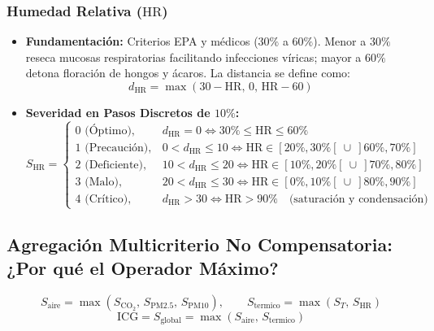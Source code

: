\documentclass[11pt,a4paper]{article}
\begin{document}
\subsubsection{Humedad Relativa (\texorpdfstring{$\text{HR}$}{HR})}
\begin{itemize}
    \item \textbf{Fundamentación:} Criterios EPA y médicos ($30\%$ a $60\%$). Menor a $30\%$ reseca mucosas respiratorias facilitando infecciones víricas; mayor a $60\%$ detona floración de hongos y ácaros. La distancia se define como:
    \begin{equation}
    d_{\text{HR}} = \max(30 - \text{HR}, \, 0, \, \text{HR} - 60)
    \end{equation}
    \item \textbf{Severidad en Pasos Discretos de $10\%$:}
    \begin{equation}
    S_{\text{HR}} = \begin{cases}
    0\text{ (Óptimo)}, & d_{\text{HR}} = 0 \iff 30\% \le \text{HR} \le 60\% \\
    1\text{ (Precaución)}, & 0 < d_{\text{HR}} \le 10 \iff \text{HR} \in [20\%, 30\%[\ \cup\ ]60\%, 70\%] \\
    2\text{ (Deficiente)}, & 10 < d_{\text{HR}} \le 20 \iff \text{HR} \in [10\%, 20\%[\ \cup\ ]70\%, 80\%] \\
    3\text{ (Malo)}, & 20 < d_{\text{HR}} \le 30 \iff \text{HR} \in [0\%, 10\%[\ \cup\ ]80\%, 90\%] \\
    4\text{ (Crítico)}, & d_{\text{HR}} > 30 \iff \text{HR} > 90\%\quad\text{(saturación y condensación)}
    \end{cases}
    \end{equation}
\end{itemize}

\subsection{Agregación Multicriterio No Compensatoria: ¿Por qué el Operador Máximo?}
\begin{equation}
S_{\text{aire}} = \max\left(S_{\text{CO}_2}, \, S_{\text{PM2.5}}, \, S_{\text{PM10}}\right),\qquad
S_{\text{termico}} = \max\left(S_T, \, S_{\text{HR}}\right)
\end{equation}
\begin{equation}
\text{ICG} = S_{\text{global}} = \max\left(S_{\text{aire}}, \, S_{\text{termico}}\right)
\end{equation}
\end{document}
